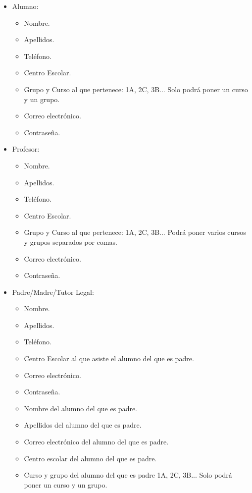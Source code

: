 	\begin{itemize}
		\item Alumno:
			\begin{itemize}
				\item Nombre.
				\item Apellidos.
				\item Teléfono.
				\item Centro Escolar.
				\item Grupo y Curso al que pertenece: 1A, 2C, 3B... Solo podrá poner un curso y un grupo.
				\item Correo electrónico.
				\item Contraseña.
			\end{itemize}
		\item Profesor:
			\begin{itemize}
				\item Nombre.
				\item Apellidos.
				\item Teléfono.
				\item Centro Escolar.
				\item Grupo y Curso al que pertenece: 1A, 2C, 3B... Podrá poner varios cursos y grupos separados por comas.
				\item Correo electrónico.
				\item Contraseña.
			\end{itemize}
		\item Padre/Madre/Tutor Legal:
			\begin{itemize}
				\item Nombre.
				\item Apellidos.
				\item Teléfono.
				\item Centro Escolar al que asiste el alumno del que es padre.
				\item Correo electrónico.
				\item Contraseña.
				\item Nombre del alumno del que es padre.
				\item Apellidos del alumno del que es padre.
				\item Correo electrónico del alumno del que es padre.
				\item Centro escolar del alumno del que es padre.
				\item Curso y grupo del alumno del que es padre 1A, 2C, 3B... Solo podrá poner un curso y un grupo.
			\end{itemize}
	\end{itemize}
